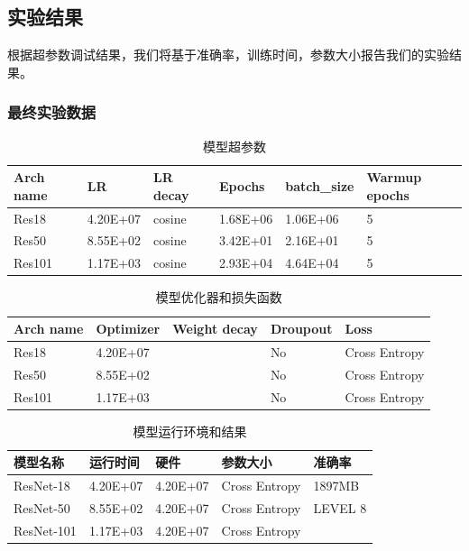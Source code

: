 \documentclass[hyperref, UTF8, 12pt]{article}
\theoremstyle{definition}
\begin{document}
\subsection{实验结果}
根据超参数调试结果，我们将基于准确率，训练时间，参数大小报告我们的实验结果。
\subsubsection{最终实验数据}
\begin{table}[h]
	\centering
	\caption{模型超参数}
	\begin{tabular}{l|l|l|l|l|l}
		\toprule
		Arch name & LR       & LR decay & Epochs   & batch\_size & Warmup epochs \\ \midrule
		Res18     & 4.20E+07 & cosine   & 1.68E+06 & 1.06E+06   & 5             \\ \midrule
		Res50     & 8.55E+02 & cosine   & 3.42E+01 & 2.16E+01   & 5              \\ \midrule
		Res101    & 1.17E+03 & cosine   & 2.93E+04 & 4.64E+04   &  5            \\ \bottomrule
	\end{tabular}
\end{table}

\begin{table}[h]
	\centering
	\caption{模型优化器和损失函数}
	\begin{tabular}{l|l|l|l|l}
		\toprule
		Arch name & Optimizer& Weight decay & Droupout   & Loss           \\ \midrule
		Res18     & 4.20E+07 &         	    & No 	     & Cross Entropy  \\ \midrule
		Res50     & 8.55E+02 &              & No         & Cross Entropy  \\ \midrule
		Res101    & 1.17E+03 &              & No         & Cross Entropy  \\ \bottomrule
	\end{tabular}
\end{table}

\begin{table}[h]
	\centering
	\caption{模型运行环境和结果}
	\begin{tabular}{l|l|l|l|l}
		\toprule
		模型名称       & 运行时间      & 硬件         & 参数大小     & 准确率 	 \\ \midrule
		ResNet-18     & 4.20E+07     & 4.20E+07     & Cross Entropy  & 1897MB        \\ \midrule
		ResNet-50     & 8.55E+02     & 4.20E+07     & Cross Entropy  & LEVEL 8       \\ \midrule
		ResNet-101    & 1.17E+03     & 4.20E+07      & Cross Entropy &               \\ \bottomrule
	\end{tabular}
\end{table}
\end{document}
